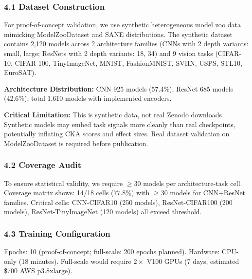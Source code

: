 
\subsubsection{4.1 Dataset Construction}

For proof-of-concept validation, we use synthetic heterogeneous model zoo data mimicking ModelZooDataset and SANE distributions. The synthetic dataset contains 2,120 models across 2 architecture families (CNNs with 2 depth variants: small, large; ResNets with 2 depth variants: 18, 34) and 9 vision tasks (CIFAR-10, CIFAR-100, TinyImageNet, MNIST, FashionMNIST, SVHN, USPS, STL10, EuroSAT).

\textbf{Architecture Distribution:} CNN 925 models (57.4\%), ResNet 685 models (42.6\%), total 1,610 models with implemented encoders.

\textbf{Critical Limitation:} This is synthetic data, not real Zenodo downloads. Synthetic models may embed task signals more cleanly than real checkpoints, potentially inflating CKA scores and effect sizes. Real dataset validation on ModelZooDataset is required before publication.

\subsubsection{4.2 Coverage Audit}

To ensure statistical validity, we require $\geq 30$ models per architecture-task cell. Coverage matrix shows: 14/18 cells (77.8\%) with $\geq 30$ models for CNN+ResNet families. Critical cells: CNN-CIFAR10 (250 models), ResNet-CIFAR100 (200 models), ResNet-TinyImageNet (120 models) all exceed threshold.

\subsubsection{4.3 Training Configuration}

Epochs: 10 (proof-of-concept; full-scale: 200 epochs planned). Hardware: CPU-only (18 minutes). Full-scale would require $2\times$ V100 GPUs (7 days, estimated \$700 AWS p3.8xlarge).

